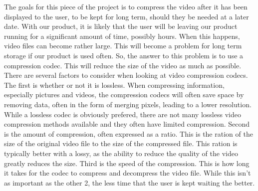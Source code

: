 \documentclass[letterpaper,10pt,onecolumn,draftclsnofoot]{IEEEtran}
\begin{document}
The goals for this piece of the project is to compress the video after it has been displayed to the user, to be kept for long term, should they be needed at a later date.
With our product, it is likely that the user will be leaving our product running for a significant amount of time, possibly hours.
When this happens, video files can become rather large.
This will become a problem for long term storage if our product is used often.
So, the answer to this problem is to use a compression codec.
This will reduce the size of the video as much as possible.
There are several factors to consider when looking at video compression codecs.
The first is whether or not it is lossless.
When compressing information, especially pictures and videos, the compression codecs will often save space by removing data, often in the form of merging pixels, leading to a lower resolution.
While a lossless codec is obviously prefered, there are not many lossless video compression methods available and they often have limited compression.
Second is the amount of compression, often expressed as a ratio.
This is the ration of the size of the original video file to the size of the compressed file.
This ration is typically better with a lossy, as the ability to reduce the quality of the video greatly reduces the size.
Third is the speed of the compression.
This is how long it takes for the codec to compress and decompress the video file.
While this isn't as important as the other 2, the less time that the user is kept waiting the better.



\end{document}
